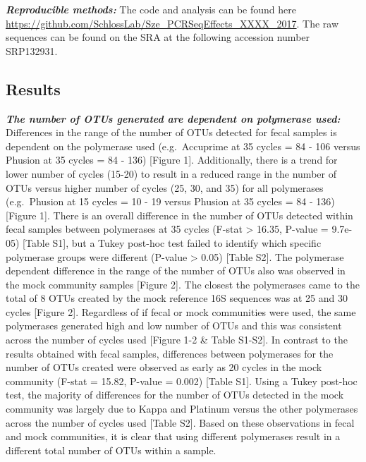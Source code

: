 \documentclass[11pt,]{article}
\begin{document}
\textbf{\emph{Reproducible methods:}} The code and analysis can be found
here \url{https://github.com/SchlossLab/Sze_PCRSeqEffects_XXXX_2017}.
The raw sequences can be found on the SRA at the following accession
number SRP132931.

\newpage

\subsection{Results}\label{results}

\textbf{\emph{The number of OTUs generated are dependent on polymerase
used:}} Differences in the range of the number of OTUs detected for
fecal samples is dependent on the polymerase used (e.g.~Accuprime at 35
cycles = 84 - 106 versus Phusion at 35 cycles = 84 - 136) {[}Figure
1{]}. Additionally, there is a trend for lower number of cycles (15-20)
to result in a reduced range in the number of OTUs versus higher number
of cycles (25, 30, and 35) for all polymerases (e.g.~Phusion at 15
cycles = 10 - 19 versus Phusion at 35 cycles = 84 - 136) {[}Figure 1{]}.
There is an overall difference in the number of OTUs detected within
fecal samples between polymerases at 35 cycles (F-stat \textgreater{}
16.35, P-value = 9.7e-05) {[}Table S1{]}, but a Tukey post-hoc test
failed to identify which specific polymerase groups were different
(P-value \textgreater{} 0.05) {[}Table S2{]}. The polymerase dependent
difference in the range of the number of OTUs also was observed in the
mock community samples {[}Figure 2{]}. The closest the polymerases came
to the total of 8 OTUs created by the mock reference 16S sequences was
at 25 and 30 cycles {[}Figure 2{]}. Regardless of if fecal or mock
communities were used, the same polymerases generated high and low
number of OTUs and this was consistent across the number of cycles used
{[}Figure 1-2 \& Table S1-S2{]}. In contrast to the results obtained
with fecal samples, differences between polymerases for the number of
OTUs created were observed as early as 20 cycles in the mock community
(F-stat = 15.82, P-value = 0.002) {[}Table S1{]}. Using a Tukey post-hoc
test, the majority of differences for the number of OTUs detected in the
mock community was largely due to Kappa and Platinum versus the other
polymerases across the number of cycles used {[}Table S2{]}. Based on
these observations in fecal and mock communities, it is clear that using
different polymerases result in a different total number of OTUs within
a sample.
\end{document}
